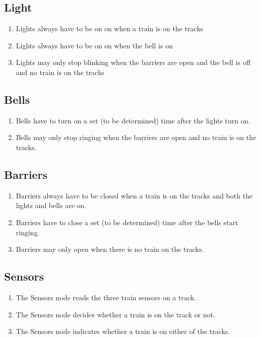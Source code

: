 \documentclass[final]{report}
\begin{document}
\subsection{Light}
	\begin{enumerate}
		\item Lights always have to be on on when a train is on the tracks
		\item Lights always have to be on on when the bell is on
		\item Lights may only stop blinking when the barriers are open and the bell is off and no train is on the tracks
	\end{enumerate}

\subsection{Bells}
	\begin{enumerate}
		\item Bells have to turn on a set (to be determined) time after the lights turn on.
		\item Bells may only stop ringing when the barriers are open and no train is on the tracks.
	\end{enumerate}

\subsection{Barriers}
	\begin{enumerate}
		\item Barriers always have to be closed when a train is on the tracks and both the lights and bells are on.
		\item Barriers have to close a set (to be determined) time after the bells start ringing.
		\item Barriers may only open when there is no train on the tracks.
	\end{enumerate}

\subsection{Sensors}
	\begin{enumerate}
		\item The Sensors node reads the three train sensors on a track.
		\item The Sensors node decides whether a train is on the track or not.
		\item The Sensors node indicates whether a train is on either of the tracks.
	\end{enumerate}
\end{document}
